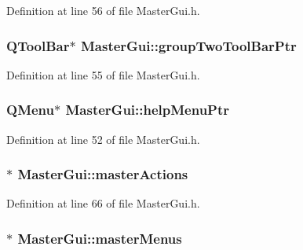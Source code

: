 Definition at line 56 of file Master\-Gui.\-h.

\hypertarget{class_master_gui_aa2c7522e568a43f38861795af343bf76}{
\subsubsection[{group\-Two\-Tool\-Bar\-Ptr}]{\setlength{\rightskip}{0pt plus 5cm}Q\-Tool\-Bar$\ast$ Master\-Gui\-::group\-Two\-Tool\-Bar\-Ptr\hspace{0.3cm}{\ttfamily [private]}}}\label{class_master_gui_aa2c7522e568a43f38861795af343bf76}


Definition at line 55 of file Master\-Gui.\-h.

\hypertarget{class_master_gui_a4125e9702c79a263642bf83f5f1e2192}{
\subsubsection[{help\-Menu\-Ptr}]{\setlength{\rightskip}{0pt plus 5cm}Q\-Menu$\ast$ Master\-Gui\-::help\-Menu\-Ptr\hspace{0.3cm}{\ttfamily [private]}}}\label{class_master_gui_a4125e9702c79a263642bf83f5f1e2192}


Definition at line 52 of file Master\-Gui.\-h.

\hypertarget{class_master_gui_a85dc72333d336db18a92207a09db4ce3}{
\subsubsection[{master\-Actions}]{$\ast$ Master\-Gui\-::master\-Actions\hspace{0.3cm}{\ttfamily [private]}}}\label{class_master_gui_a85dc72333d336db18a92207a09db4ce3}


Definition at line 66 of file Master\-Gui.\-h.

\hypertarget{class_master_gui_a27f793278e486a5bfec69ef366199e5d}{
\subsubsection[{master\-Menus}]{$\ast$ Master\-Gui\-::master\-Menus\hspace{0.3cm}{\ttfamily [private]}}}\label{class_master_gui_a27f793278e486a5bfec69ef366199e5d}


